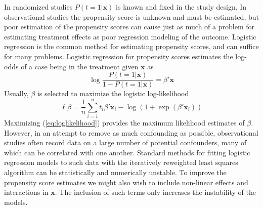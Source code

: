 \documentclass{article}
\begin{document}
In randomized studies $P(t=1|\mathbf{x})$ is known and fixed in the study
design. In observational studies the propensity score is unknown and must be
estimated, but poor estimation of the propensity scores can cause just as much
of a problem for estimating treatment effects as poor regression modeling of
the outcome. Logistic regression is the common method for estimating propensity
scores, and can suffice for many problems. Logistic regression for propensity
scores estimates the log-odds of a case being in the treatment given
$\mathbf{x}$ as
\begin{equation}
\log\frac{P(t=1|\mathbf{x})}{1-P(t=1|\mathbf{x})} = \beta'\mathbf{x}
\label{eq:logodds}
\end{equation}
Usually, $\beta$ is selected to maximize the logistic log-likelihood
\begin{equation}
\ell{\beta}=\frac{1}{n}\sum_{i=1}^n
t_i\beta'\mathbf{x}_i-\log\left(1+\exp(\beta'\mathbf{x}_i)\right)
\label{eq:loglikelihood}
\end{equation}
Maximizing (\ref{eq:loglikelihood}) provides the maximum likelihood estimates
of $\beta$. However, in an attempt to remove as much confounding as possible,
observational studies often record data on a large number of potential
confounders, many of which can be correlated with one another. Standard methods
for fitting logistic regression models to such data with the iteratively
reweighted least squares algorithm can be statistically and numerically
unstable. To improve the propensity score estimates we might also wish to
include non-linear effects and interactions in $\mathbf{x}$. The inclusion of
such terms only increases the instability of the models.
\end{document}
